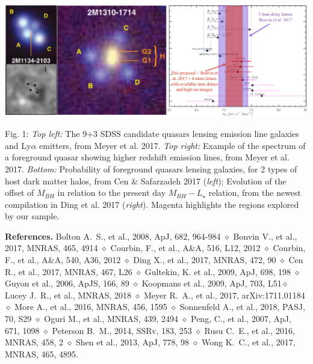 \documentclass[a4paper,11pt]{article}
\begin{document}
\begin{minipage}{\textwidth}
\includegraphics[width=0.95\hsize]{figure.eps}
\end{minipage}
Fig. 1: {\it Top left:} The 9+3 SDSS candidate quasars lensing emission line galaxies and Ly$\alpha$ emitters, from Meyer et al. 2017. {\it Top right:} Example of the spectrum of a foreground quasar showing higher redshift emission lines, from Meyer et al. 2017. {\it Bottom:} Probability of foreground quasars lensing galaxies, for 2 types of host dark matter halos, from Cen \& Safarzadeh 2017 ({\it left}); Evolution of the offset of $M_{BH}$ in relation to the present day $M_{BH} - L_{\star}$ relation, from the newest compilation in Ding et al. 2017 ({\it right}). Magenta highlights the regions explored by our sample.
  
{\bf References.} Bolton A.~S., et al., 2008, ApJ, 682, 964-984 $\diamond$ Bonvin V., et al., 2017, MNRAS, 465, 4914 $\diamond$ Courbin, F., et al., A\&A, 516, L12, 2012 $\diamond$ Courbin, F., et al., A\&A, 540, A36, 2012 $\diamond$ Ding X., et al., 2017, MNRAS, 472, 90 $\diamond$ Cen R., et al., 2017, MNRAS, 467, L26 $\diamond$ Gultekin, K. et al., 2009, ApJ, 698, 198 $\diamond$ Guyon et al., 2006, ApJS, 166, 89 $\diamond$ Koopmans et al., 2009, ApJ, 703, L51$\diamond$ Lucey J.~R., et al., MNRAS, 2018 $\diamond$ Meyer R.~A., et al., 2017, arXiv:1711.01184 $\diamond$ More A., et al., 2016, MNRAS, 456, 1595 $\diamond$ Sonnenfeld A., et al., 2018, PASJ, 70, S29 $\diamond$ Oguri M., et al., MNRAS, 439, 2494 $\diamond$ Peng, C., et al., 2007, ApJ, 671, 1098 $\diamond$ Peterson B.~M., 2014, SSRv, 183, 253 $\diamond$ Rusu C.~E., et al., 2016, MNRAS, 458, 2 $\diamond$ Shen et al., 2013, ApJ, 778, 98 $\diamond$ Wong K.~C., et al., 2017, MNRAS, 465, 4895.
\end{document}
